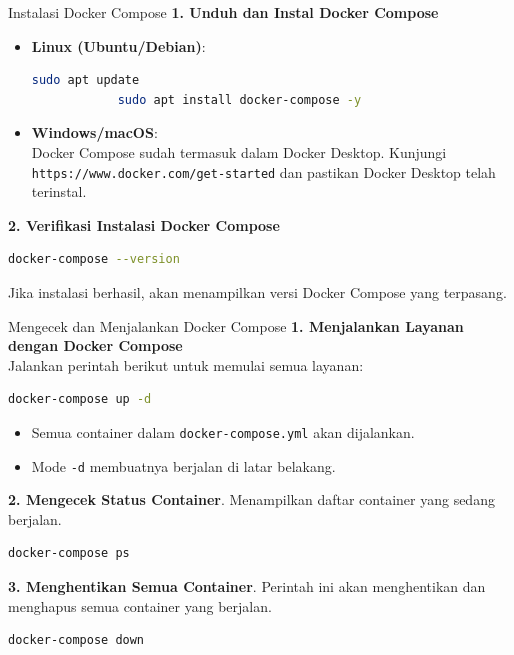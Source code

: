 \documentclass[aspectratio=169, table]{beamer}
\begin{document}
\begin{frame}[fragile]{Instalasi Docker Compose}
	\vspace{20pt}
	\textbf{1. Unduh dan Instal Docker Compose} \\
	\begin{itemize}
		\item \textbf{Linux (Ubuntu/Debian)}:
		\begin{lstlisting}[language=bash]
			sudo apt update
			sudo apt install docker-compose -y
		\end{lstlisting}
		\item \textbf{Windows/macOS}: \\
		Docker Compose sudah termasuk dalam Docker Desktop. Kunjungi \texttt{https://www.docker.com/get-started} dan pastikan Docker Desktop telah terinstal.
	\end{itemize}
	
	\textbf{2. Verifikasi Instalasi Docker Compose} \\
	\begin{lstlisting}[language=bash]
		docker-compose --version
	\end{lstlisting}
	Jika instalasi berhasil, akan menampilkan versi Docker Compose yang terpasang.
\end{frame}

\begin{frame}[fragile]{Mengecek dan Menjalankan Docker Compose}
	\vspace{20pt}
	\textbf{1. Menjalankan Layanan dengan Docker Compose} \\
	Jalankan perintah berikut untuk memulai semua layanan:
	\begin{lstlisting}[language=bash]
		docker-compose up -d
	\end{lstlisting}
	\begin{itemize}
		\item Semua container dalam \texttt{docker-compose.yml} akan dijalankan.
		\item Mode \texttt{-d} membuatnya berjalan di latar belakang.
	\end{itemize}
	
	\textbf{2. Mengecek Status Container}. Menampilkan daftar container yang sedang berjalan. \\
	\begin{lstlisting}[language=bash]
		docker-compose ps
	\end{lstlisting}
	
	\textbf{3. Menghentikan Semua Container}. Perintah ini akan menghentikan dan menghapus semua container yang berjalan. \\
	\begin{lstlisting}[language=bash]
		docker-compose down
	\end{lstlisting}
\end{frame}
\end{document}
